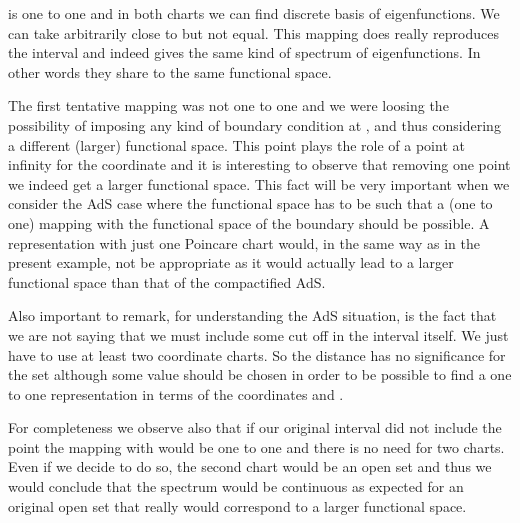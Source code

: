 \documentclass[a4paper,12pt]{article}
\begin{document}
\noindent 
is one to one and in both charts we can find discrete
basis of eigenfunctions. 
We can take \coordHE{}  arbitrarily close to \coordHE{} but not equal.
This mapping does really reproduces the interval \coordHE{} and indeed gives the 
same kind of spectrum of eigenfunctions. In other words they share 
to the same functional space. 

The first tentative mapping was not one to one and we were 
loosing the possibility of imposing any kind of boundary condition at 
\coordHE{}, and thus considering a different (larger) functional space.
This point plays the role of a point at infinity for the coordinate
\coordHE{} and it is interesting to observe that removing one point we 
indeed get a larger functional space. This fact will be very important 
when we consider the AdS case where the functional space 
has to be such that a (one to one) mapping with the functional space 
of the boundary should be possible.
A representation with just one Poincare chart would, in the same 
way as in the present example, not be appropriate as it would actually
lead to  a larger functional space than that of the compactified AdS.

Also important to remark, for understanding the AdS situation,
is the fact that we are not saying that we must include some cut off 
in the interval \coordHE{} itself. We just have to use at least two coordinate 
charts. So the distance \coordHE{} has no significance for the set \coordHE{} although
some value should be chosen in order to be possible to find a one to one 
representation in terms of the coordinates  \coordHE{} and \coordHE{}. 

For completeness we observe also that if our original interval did 
not include the point \coordHE{} the mapping with \coordHE{} would be 
one to one and  there is no need for two charts.
Even if we decide to do so, the second chart would be an open set
and thus we would conclude that the spectrum would be 
continuous as expected for an original open set that really would 
correspond to a larger functional space.


 
\bigskip
\end{document}
